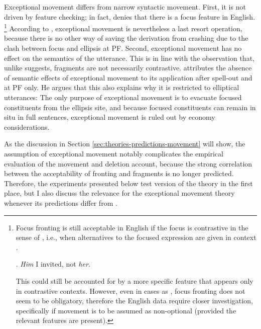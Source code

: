 Exceptional movement differs from narrow syntactic movement. First, it is not driven by feature checking; in fact, \citet[195]{weir2014} denies that there is a focus feature in English.%
%
\footnote{Focus fronting is still acceptable in English if the focus is contrastive in the sense of \citet{krifka2007}, i.e., when alternatives to the focused expression are given in context \Next.

\ex. \textit{Him} I invited, not \textit{her}. \hfill

This could still be accounted for by a more specific feature that appears only in contrastive contexts. However, even in cases as \Last, focus fronting does not seem to be obligatory, therefore the English data require closer investigation, specifically if movement is to be assumed as non-optional (provided the relevant features are present).}\afterfn%
%
According to \citeauthor{weir2014}, exceptional movement is nevertheless a last resort operation, because there is no other way of saving the derivation from crashing due to the clash between focus and ellipsis at PF. Second, exceptional movement has no effect on the semantics of the utterance. This is in line with the observation that, unlike \citet{gengel2007} suggests, fragments are not necessarily contrastive. \citet[183]{weir2014} attributes the absence of semantic effects of exceptional movement to its application after spell-out and at PF only. He argues that this also explains why it is restricted to elliptical utterances: The only purpose of exceptional movement is to evacuate focused constituents from the ellipsis site, and because focused constituents can remain in situ in full sentences, exceptional movement is ruled out by economy considerations.

As the discussion in Section \ref{sec:theories-predictions-movement} will show, the assumption of exceptional movement notably complicates the empirical evaluation of the movement and deletion account, because the strong correlation between the acceptability of fronting and fragments is no longer predicted. Therefore, the experiments presented below test  version of the theory in the first place, but I also discuss the relevance for the exceptional movement theory whenever its predictions differ from \citet{merchant2004}.


